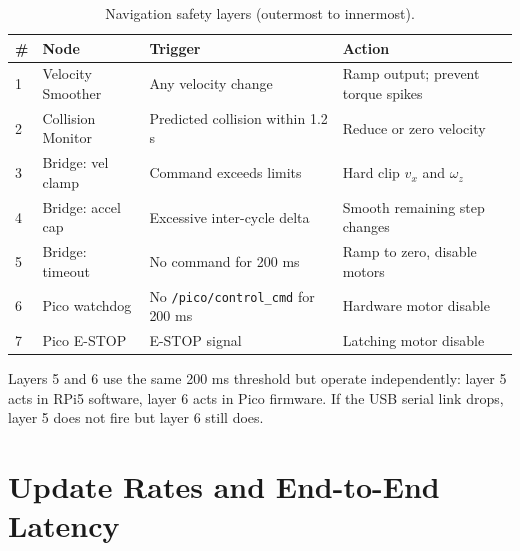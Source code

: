 \documentclass[12pt,a4paper]{report}
\begin{document}
\begin{table}[H]
\centering
\caption{Navigation safety layers (outermost to innermost).}
\label{tab:safety_layers}
\begin{tabularx}{\textwidth}{|p{0.5cm}|p{3cm}|p{3cm}|X|}
\hline
\textbf{\#} & \textbf{Node} & \textbf{Trigger} & \textbf{Action} \\
\hline
1 & Velocity Smoother & Any velocity change & Ramp output; prevent torque spikes \\
\hline
2 & Collision Monitor & Predicted collision within 1.2 s & Reduce or zero velocity \\
\hline
3 & Bridge: vel clamp & Command exceeds limits & Hard clip $v_x$ and $\omega_z$ \\
\hline
4 & Bridge: accel cap & Excessive inter-cycle delta & Smooth remaining step changes \\
\hline
5 & Bridge: timeout & No command for 200 ms & Ramp to zero, disable motors \\
\hline
6 & Pico watchdog & No \texttt{/pico/control\_cmd} for 200 ms & Hardware motor disable \\
\hline
7 & Pico E-STOP & E-STOP signal & Latching motor disable \\
\hline
\end{tabularx}
\end{table}

Layers 5 and 6 use the same 200 ms threshold but operate independently: layer 5 acts in RPi5 software, layer 6 acts in Pico firmware. If the USB serial link drops, layer 5 does not fire but layer 6 still does.

\section{Update Rates and End-to-End Latency}
\end{document}
